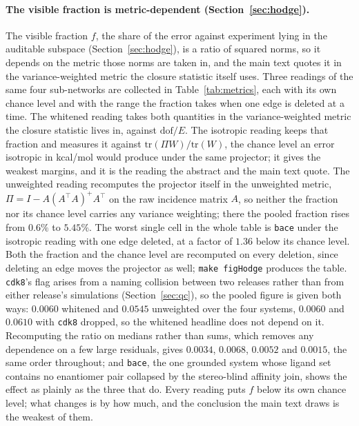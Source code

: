 \paragraph{The visible fraction is metric-dependent (Section~\ref{sec:hodge}).} The visible
fraction $f$, the share of the error against experiment lying in the auditable subspace
(Section~\ref{sec:hodge}), is a ratio of squared norms, so it depends on the metric those
norms are taken in, and the main text quotes it in the variance-weighted metric the closure
statistic itself uses. Three readings of the same four sub-networks are collected in
Table~\ref{tab:metrics}, each with its own chance level and with the range the fraction takes when
one edge is deleted at a time. The whitened reading takes both quantities in the variance-weighted
metric the closure statistic lives in, against $\mathrm{dof}/E$. The isotropic reading keeps that
fraction and measures it against $\mathrm{tr}(\Pi W)/\mathrm{tr}(W)$, the chance level an error
isotropic in kcal/mol would produce under the same projector; it gives the weakest margins, and it
is the reading the abstract and the main text quote. The unweighted reading recomputes the
projector itself in the unweighted metric, $\Pi=I-A(A^{\top}A)^{+}A^{\top}$ on the raw incidence
matrix $A$, so neither the fraction nor its chance level carries any variance weighting; there the
pooled fraction rises from $0.6\%$ to $5.45\%$. The worst single cell in the whole table is
\texttt{bace} under the isotropic reading with one edge deleted, at a factor of $1.36$ below its
chance level. Both the fraction and the chance level are recomputed on every deletion, since
deleting an edge moves the projector as well; \texttt{make figHodge} produces the table.
\texttt{cdk8}'s flag arises from a naming collision between two releases rather than from either
release's simulations (Section~\ref{sec:qc}), so the pooled figure is given both ways: $0.0060$ whitened and
$0.0545$ unweighted over the four systems, $0.0060$ and $0.0610$ with \texttt{cdk8} dropped, so the
whitened headline does not depend on it. Recomputing the ratio on medians rather than sums, which
removes any dependence on a few large residuals, gives $0.0034$, $0.0068$, $0.0052$ and $0.0015$,
the same order throughout; and \texttt{bace}, the one grounded system whose ligand set contains no
enantiomer pair collapsed by the stereo-blind affinity join, shows the effect as plainly as the
three that do. Every reading puts $f$ below its own chance
level; what changes is by how much, and the conclusion the main text draws is the weakest of them.

